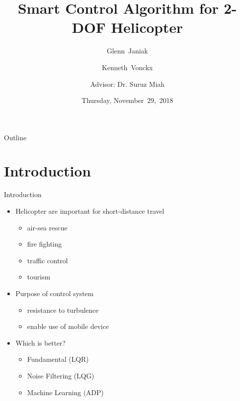 \documentclass{beamer}
\title[2-DOF Helicopter]{Smart Control Algorithm for 2-DOF Helicopter}
\author[G.~Janiak, K.~Vonckx]{Glenn~Janiak \and Kenneth~Vonckx \and
Advisor: Dr. Suruz Miah}
\institute[Bradley University] %
{
  Department of Electrical and Computer Engineering\\
  Bradley University\\
  1501 W. Bradley Avenue\\
  Peoria, IL, 61625, USA
}
\date[November~29,~2018]{Thursday, November~29,~2018}
\begin{document}
\begin{frame}
  \titlepage
\end{frame}

\begin{frame}{Outline} %
  \tableofcontents%
\end{frame}

\section{Introduction}

\begin{frame}{Introduction}{} %
    \begin{itemize}
        \item Helicopter are important for short-distance travel
            \begin{itemize}
                \item air-sea rescue
                \item fire fighting
                \item traffic control
                \item tourism
            \end{itemize}
        \item Purpose of control system
            \begin{itemize}
                \item resistance to turbulence
                \item enable use of mobile device
            \end{itemize}
        \item Which is better?
            \begin{itemize}
                \item Fundamental (LQR)
                \item Noise Filtering (LQG) 
                \item Machine Learning (ADP)
            \end{itemize}
    \end{itemize}
\end{frame}
\end{document}
